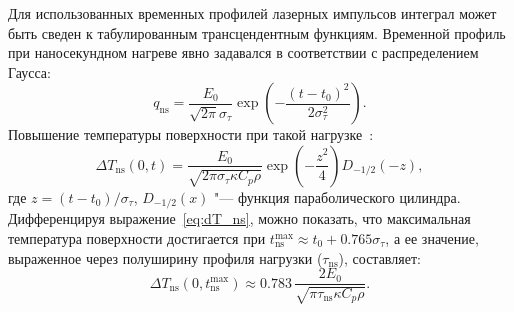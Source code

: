 Для использованных временных профилей лазерных импульсов интеграл может быть сведен к табулированным трансцендентным функциям. Временной профиль при наносекундном нагреве явно задавался в соответствии с распределением Гаусса:
\begin{equation}
    q_\mathrm{ns}=\frac{E_0}{\sqrt{2\pi}\sigma_\tau} \exp \left( -\frac{(t-t_0)^2}{2\sigma_\tau^2} \right).
\end{equation} 
Повышение температуры поверхности при такой нагрузке~\cite{Bechtel1975}:
\begin{equation}
    \label{eq:dT_ns}
    \Delta T_\mathrm{ns}(0,t) = \frac{E_0}{\sqrt{2\pi\sigma_\tau \kappa C_p \rho}} \exp \left( -\frac{z^2}{4} \right) D_{-1/2}(-z),
\end{equation}
где \( z = (t-t_0)/\sigma_\tau \), \(D_{-1/2}(x) \) "--- функция параболического цилиндра. Дифференцируя выражение~\cref{eq:dT_ns}, можно показать, что максимальная температура поверхности достигается при \( t_\mathrm{ns}^{\max} \approx t_0 + \num{0.765}\sigma_\tau \), а ее значение, выраженное через полуширину профиля нагрузки (\(\tau_\mathrm{ns}\)), составляет:
\begin{equation}
    \Delta T_\mathrm{ns}(0, t_\mathrm{ns}^{\max}) \approx \num{0.783} \, \frac{2E_0}{\sqrt{\pi \tau_\mathrm{ns} \kappa C_p \rho}}.
\end{equation} 

